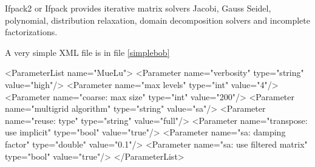 Ifpack2 or Ifpack provides iterative matrix solvers Jacobi, Gauss Seidel, polynomial, distribution relaxation, domain decomposition solvers and incomplete factorizations.


A very simple XML file is in file \ref{simplebob}
\begin{python}[caption=simplebob.xml,label=simplebob]
<ParameterList name="MueLu"> 
  <Parameter name="verbosity"               type="string"    value="high"/> 
  <Parameter name="max levels"              type="int"       value="4"/>
  <Parameter name="coarse: max size"        type="int"       value="200"/>
  <Parameter name="multigrid algorithm"     type="string"    value="sa"/>
  <Parameter name="reuse: type"             type="string"    value="full"/>
  <Parameter name="transpose: use implicit" type="bool"      value="true"/>
  <Parameter name="sa: damping factor"      type="double"    value="0.1"/> 
  <Parameter name="sa: use filtered matrix" type="bool"      value="true"/>
</ParameterList>
\end{python}

